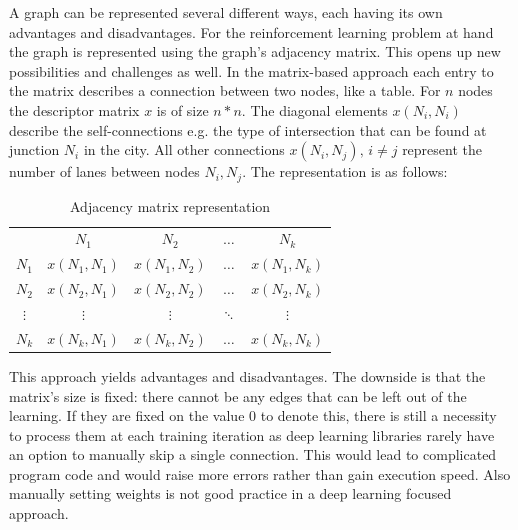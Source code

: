 \documentclass[
]{elteikthesis}[2023/04/10]
\begin{document}
A graph can be represented several different ways, each having its
own advantages and disadvantages. For the reinforcement learning problem
at hand the graph is represented using the graph's adjacency matrix.
This opens up new possibilities and challenges as well. In the matrix-based
approach each entry to the matrix describes a connection between two
nodes, like a table. For $n$ nodes the descriptor matrix $x$ is
of size $n*n$. The diagonal elements $x(N_{i},N_{i})$ describe the
self-connections e.g. the type of intersection that can be found at
junction $N_{i}$ in the city. All other connections $x(N_{i},N_{j}),\,i\neq j$
represent the number of lanes between nodes $N_{i},N_{j}$. The representation
is as follows:
\begin{center}
\begin{table}[H]
\begin{centering}
\begin{tabular}{c|c|c|c|c|}
\multicolumn{1}{c}{} & \multicolumn{1}{c}{$N_{1}$} & \multicolumn{1}{c}{$N_{2}$} & \multicolumn{1}{c}{$\ldots$} & \multicolumn{1}{c}{$N_{k}$}\tabularnewline
\cline{2-5} \cline{3-5} \cline{4-5} \cline{5-5} 
$N_{1}$ & $x(N_{1},N_{1})$ & $x(N_{1},N_{2})$ & $\ldots$ & $x(N_{1},N_{k})$\tabularnewline
\cline{2-5} \cline{3-5} \cline{4-5} \cline{5-5} 
$N_{2}$ & $x(N_{2},N_{1})$ & $x(N_{2},N_{2})$ & $\ldots$ & $x(N_{2},N_{k})$\tabularnewline
\cline{2-5} \cline{3-5} \cline{4-5} \cline{5-5} 
$\vdots$ & $\vdots$ & $\vdots$ & $\ddots$ & $\vdots$\tabularnewline
\cline{2-5} \cline{3-5} \cline{4-5} \cline{5-5} 
$N_{k}$ & $x(N_{k},N_{1})$ & $x(N_{k},N_{2})$ & $\ldots$ & $x(N_{k},N_{k})$\tabularnewline
\cline{2-5} \cline{3-5} \cline{4-5} \cline{5-5} 
\end{tabular}
\par\end{centering}
\centering{}\caption{Adjacency matrix representation}
\end{table}
\par\end{center}

This approach yields advantages and disadvantages. The downside is
that the matrix's size is fixed: there cannot be any edges that can
be left out of the learning. If they are fixed on the value $0$ to
denote this, there is still a necessity to process them at each training
iteration as deep learning libraries rarely have an option to manually
skip a single connection. This would lead to complicated program code and
would raise more errors rather than gain execution speed. Also manually
setting weights is not good practice in a deep learning focused approach.
\end{document}

